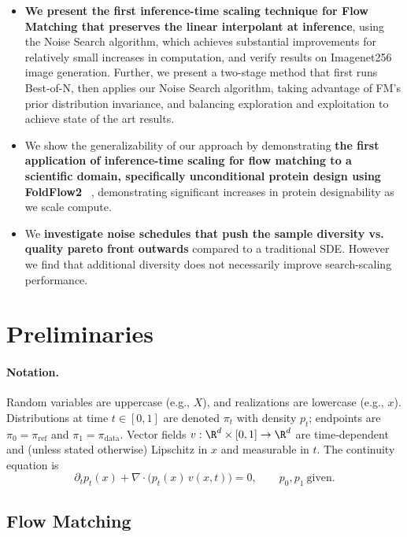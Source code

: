\documentclass{article} %
\begin{document}
\begin{itemize}[noitemsep,topsep=0pt,parsep=0pt,partopsep=0pt,leftmargin=*]
    \item \textbf{We present the first inference-time scaling technique for Flow Matching that preserves the linear interpolant at inference}, using the Noise Search algorithm, which achieves substantial improvements for relatively small increases in computation, and verify results on Imagenet256 image generation. Further, we present a two-stage method that first runs Best-of-N, then applies our Noise Search algorithm, taking advantage of FM's prior distribution invariance, and balancing exploration and exploitation to achieve state of the art results.
    \item We show the generalizability of our approach by demonstrating \textbf{the first application of inference-time scaling for flow matching to a scientific domain, specifically unconditional protein design using FoldFlow2} ~\cite{foldflow2}, demonstrating significant increases in protein designability as we scale compute.
    \item We \textbf{investigate noise schedules that push the sample diversity vs. quality pareto front outwards} compared to a traditional SDE. However we find that additional diversity does not necessarily improve search-scaling performance.
\end{itemize}

\section{Preliminaries}
\label{sec:preliminaries}

\paragraph{Notation.} Random variables are uppercase (e.g., $X$), and realizations are lowercase (e.g., $x$). Distributions at time $t\in[0,1]$ are denoted $\pi_t$ with density $p_t$; endpoints are $\pi_0=\pi_{\mathrm{ref}}$ and $\pi_1=\pi_{\mathrm{data}}$. Vector fields $v:\R^d\times[0,1]\to\R^d$ are time‑dependent and (unless stated otherwise) Lipschitz in $x$ and measurable in $t$. The continuity equation is
\begin{equation}
\label{eq:continuity}
\partial_t p_t(x) + \nabla\!\cdot\!\big(p_t(x)\,v(x,t)\big)=0,\qquad p_0,p_1\ \text{given}.
\end{equation}

\subsection{Flow Matching}
\end{document}
